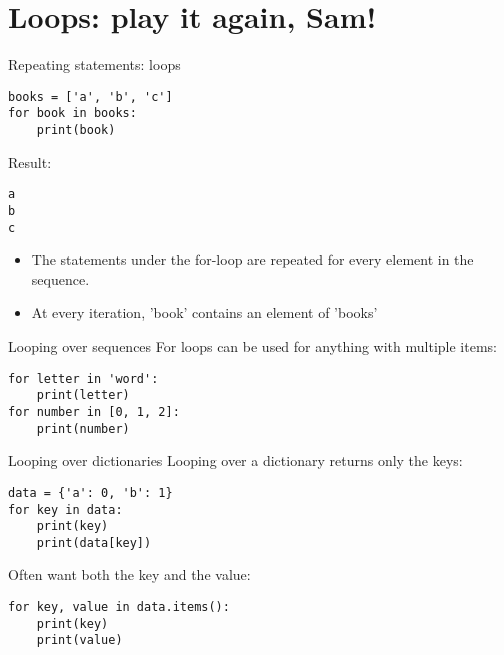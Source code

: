\documentclass{beamer}
\begin{document}
\section{Loops: play it again, Sam!}
\begin{frame}[fragile]{Repeating statements: loops}
\begin{lstlisting}
books = ['a', 'b', 'c']
for book in books:
    print(book)
\end{lstlisting}
Result:
\begin{lstlisting}
a
b
c
\end{lstlisting}

\begin{itemize}
\item The statements under the for-loop are repeated
    for every element in the sequence.
\item At every iteration, 'book' contains an element of 'books'
\end{itemize}
\end{frame}

\begin{frame}[fragile]{Looping over sequences}
For loops can be used for anything with multiple items:
\begin{lstlisting}
for letter in 'word':
    print(letter)
for number in [0, 1, 2]:
    print(number)
\end{lstlisting}
\end{frame}

\begin{frame}[fragile]{Looping over dictionaries}
Looping over a dictionary returns only the keys:
\begin{lstlisting}
data = {'a': 0, 'b': 1}
for key in data:
    print(key)
    print(data[key])
\end{lstlisting}

\pause
Often want both the key and the value:
\begin{lstlisting}
for key, value in data.items():
    print(key)
    print(value)
\end{lstlisting}
\end{frame}
\end{document}
